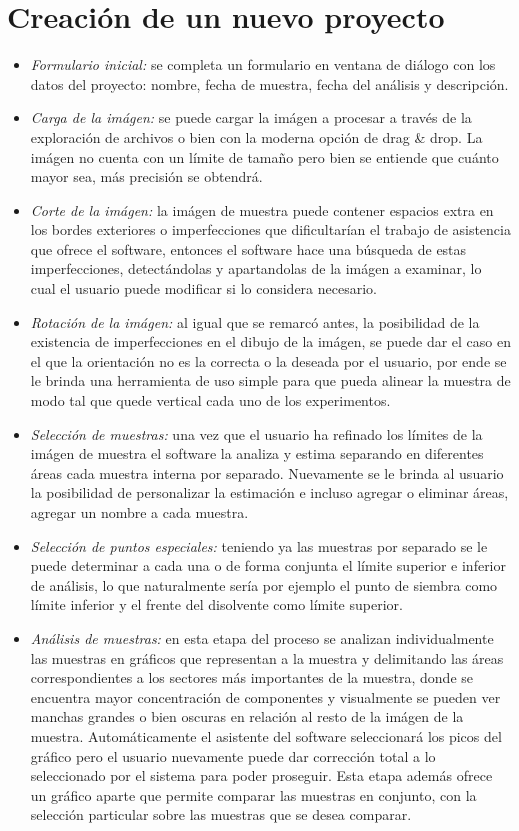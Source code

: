 \section{Creaci\'on de un nuevo proyecto}
\begin{itemize}
	\renewcommand{\labelitemi}{$\bullet$}
	\renewcommand{\labelitemii}{$\circ$}
	
	\item \textit{Formulario inicial:} se completa un formulario en ventana de di\'alogo con los datos del proyecto: nombre, fecha de muestra, fecha del an\'alisis y descripci\'on.
	\item \textit{Carga de la im\'agen:} se puede cargar la im\'agen a procesar a trav\'es de la exploraci\'on de archivos o bien con la moderna opci\'on de drag \& drop. La im\'agen no cuenta con un l\'imite de tama\~no pero bien se entiende que cu\'anto mayor sea, m\'as precisi\'on se obtendr\'a.
	\item \textit{Corte de la im\'agen:} la im\'agen de muestra puede contener espacios extra en los bordes exteriores o imperfecciones que dificultar\'ian el trabajo de asistencia que ofrece el software, entonces el software hace una b\'usqueda de estas imperfecciones, detect\'andolas y apartandolas de la im\'agen a examinar, lo cual el usuario puede modificar si lo considera necesario.
	\item \textit{Rotaci\'on de la im\'agen:} al igual que se remarc\'o antes, la posibilidad de la existencia de imperfecciones en el dibujo de la im\'agen, se puede dar el caso en el que la orientaci\'on no es la correcta o la deseada por el usuario, por ende se le brinda una herramienta de uso simple para que pueda alinear la muestra de modo tal que quede vertical cada uno de los experimentos.
	\item \textit{Selecci\'on de muestras:} una vez que el usuario ha refinado los l\'imites de la im\'agen de muestra el software la analiza y estima separando en diferentes \'areas cada muestra interna por separado. Nuevamente se le brinda al usuario la posibilidad de personalizar la estimaci\'on e incluso agregar o eliminar \'areas, agregar un nombre a cada muestra.
	\item \textit{Selecci\'on de puntos especiales:} teniendo ya las muestras por separado se le puede determinar a cada una o de forma conjunta el l\'imite superior e inferior de an\'alisis, lo que naturalmente ser\'ia por ejemplo el punto de siembra como l\'imite inferior y el frente del disolvente como l\'imite superior.
	\item \textit{An\'alisis de muestras:} en esta etapa del proceso se analizan individualmente las muestras en gr\'aficos que representan a la muestra y delimitando las \'areas correspondientes a los sectores m\'as importantes de la muestra, donde se encuentra mayor concentraci\'on de componentes y visualmente se pueden ver manchas grandes o bien oscuras en relaci\'on al resto de la im\'agen de la muestra. Autom\'aticamente el asistente del software seleccionar\'a los picos del gr\'afico pero el usuario nuevamente puede dar correcci\'on total a lo seleccionado por el sistema para poder proseguir. Esta etapa adem\'as ofrece un gr\'afico aparte que permite comparar las muestras en conjunto, con la selecci\'on particular sobre las muestras que se desea comparar.

\end{itemize}
